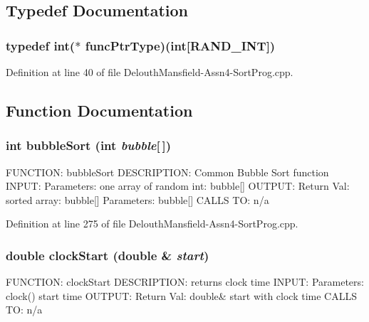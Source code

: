 \subsection{Typedef Documentation}
\hypertarget{_delouth_mansfield-_assn4-_sort_prog_8cpp_ae2987d0004dea58df8c833858c0fb370}{
\subsubsection[{funcPtrType}]{\setlength{\rightskip}{0pt plus 5cm}typedef int($\ast$ {\bf funcPtrType})(int\mbox{[}{\bf RAND\_\-INT}\mbox{]})}}
\label{_delouth_mansfield-_assn4-_sort_prog_8cpp_ae2987d0004dea58df8c833858c0fb370}


Definition at line 40 of file DelouthMansfield-\/Assn4-\/SortProg.cpp.



\subsection{Function Documentation}
\hypertarget{_delouth_mansfield-_assn4-_sort_prog_8cpp_a8bb793ac49cd588089713622d18a8c5b}{
\subsubsection[{bubbleSort}]{\setlength{\rightskip}{0pt plus 5cm}int bubbleSort (int {\em bubble}\mbox{[}$\,$\mbox{]})}}
\label{_delouth_mansfield-_assn4-_sort_prog_8cpp_a8bb793ac49cd588089713622d18a8c5b}
FUNCTION: bubbleSort DESCRIPTION: Common Bubble Sort function INPUT: Parameters: one array of random int: bubble\mbox{[}\mbox{]} OUTPUT: Return Val: sorted array: bubble\mbox{[}\mbox{]} Parameters: bubble\mbox{[}\mbox{]} CALLS TO: n/a 

Definition at line 275 of file DelouthMansfield-\/Assn4-\/SortProg.cpp.

\hypertarget{_delouth_mansfield-_assn4-_sort_prog_8cpp_a97da3b77b5ebacff9297f22e54185c1a}{
\subsubsection[{clockStart}]{\setlength{\rightskip}{0pt plus 5cm}double clockStart (double \& {\em start})}}
\label{_delouth_mansfield-_assn4-_sort_prog_8cpp_a97da3b77b5ebacff9297f22e54185c1a}
FUNCTION: clockStart DESCRIPTION: returns clock time INPUT: Parameters: clock() start time OUTPUT: Return Val: double\& start with clock time CALLS TO: n/a 

